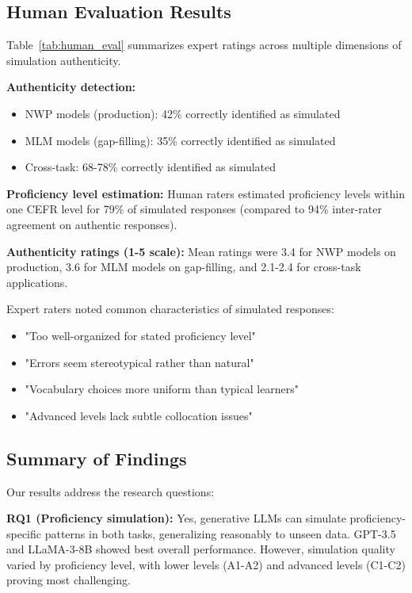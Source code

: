 \subsection{Human Evaluation Results}

Table~\ref{tab:human_eval} summarizes expert ratings across multiple dimensions of simulation authenticity.



\textbf{Authenticity detection:}
\begin{itemize}
    \item NWP models (production): 42\% correctly identified as simulated
    \item MLM models (gap-filling): 35\% correctly identified as simulated
    \item Cross-task: 68-78\% correctly identified as simulated
\end{itemize}

\textbf{Proficiency level estimation:} Human raters estimated proficiency levels within one CEFR level for 79\% of simulated responses (compared to 94\% inter-rater agreement on authentic responses).

\textbf{Authenticity ratings (1-5 scale):} Mean ratings were 3.4 for NWP models on production, 3.6 for MLM models on gap-filling, and 2.1-2.4 for cross-task applications.

Expert raters noted common characteristics of simulated responses:
\begin{itemize}
    \item "Too well-organized for stated proficiency level"
    \item "Errors seem stereotypical rather than natural"
    \item "Vocabulary choices more uniform than typical learners"
    \item "Advanced levels lack subtle collocation issues"
\end{itemize}

\subsection{Summary of Findings}

Our results address the research questions:

\textbf{RQ1 (Proficiency simulation):} Yes, generative LLMs can simulate proficiency-specific patterns in both tasks, generalizing reasonably to unseen data. GPT-3.5 and LLaMA-3-8B showed best overall performance. However, simulation quality varied by proficiency level, with lower levels (A1-A2) and advanced levels (C1-C2) proving most challenging.

